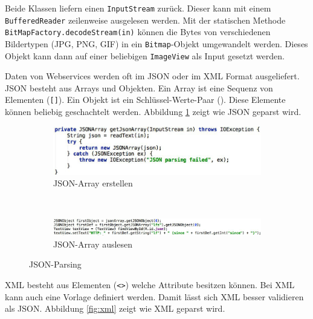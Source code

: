 Beide Klassen liefern einen \texttt{InputStream} zurück. Dieser kann mit einem \texttt{BufferedReader} zeilenweise ausgelesen werden. Mit der statischen Methode \texttt{BitMapFactory.decodeStream(in)} können die Bytes von verschiedenen Bildertypen (JPG, PNG, GIF) in ein \texttt{Bitmap}-Objekt umgewandelt werden. Dieses Objekt kann dann auf einer beliebigen \texttt{ImageView} als Input gesetzt werden.

Daten von Webservices werden oft im JSON oder im XML Format ausgeliefert. JSON besteht aus Arrays und Objekten. Ein Array ist eine Sequenz von Elementen (\texttt{[]}). Ein Objekt ist ein Schlüssel-Werte-Paar (\texttt{{}}). Diese Elemente können beliebig geschachtelt werden. Abbildung \ref{fig:json} zeigt wie JSON geparst wird.

\begin{figure}
	\centering
	\begin{subfigure}[b]{0.48\textwidth}
		\includegraphics[width=\textwidth]{fig/json-array-erstellen}
		\caption{JSON-Array erstellen}
	\end{subfigure}
	~
	\begin{subfigure}[b]{0.48\textwidth}
		\includegraphics[width=\textwidth]{fig/json-array-auslesen}
		\caption{JSON-Array auslesen}
	\end{subfigure}
	\caption{JSON-Parsing}
	\label{fig:json}
\end{figure}

XML besteht aus Elementen (\texttt{<>}) welche Attribute besitzen können. Bei XML kann auch eine Vorlage definiert werden. Damit lässt sich XML besser validieren als JSON. Abbildung \ref{fig:xml} zeigt wie XML geparst wird.


